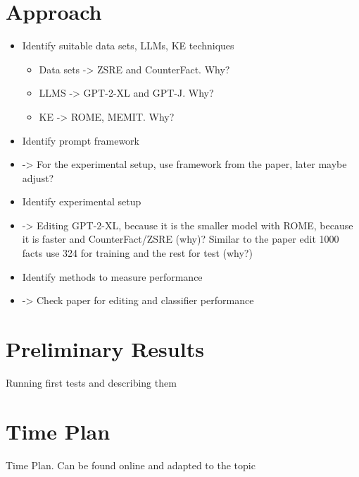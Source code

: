 \documentclass[sigplan, nonacm]{acmart}
\begin{document}
    \section{Approach}
        \begin{itemize}
		\item Identify suitable data sets, LLMs, KE techniques
            \begin{itemize}
    		\item Data sets -> ZSRE and CounterFact. Why?
    		\item LLMS -> GPT-2-XL and GPT-J. Why?
                \item KE -> ROME, MEMIT. Why?
	    \end{itemize}
		\item Identify prompt framework
            \item -> For the experimental setup, use framework from the paper, later maybe adjust?
		\item Identify experimental setup
            \item -> Editing GPT-2-XL, because it is the smaller model with ROME, because it is 
				faster and CounterFact/ZSRE (why)? Similar to the paper edit 1000 facts use 324 for 
				training and the rest for test (why?)
		\item Identify methods to measure performance
            \item -> Check paper for editing and classifier performance
	\end{itemize}

    \section{Preliminary Results}
    	Running first tests and describing them
    
    \section{Time Plan}
    	Time Plan. Can be found online and adapted to the topic
    
\end{document}
